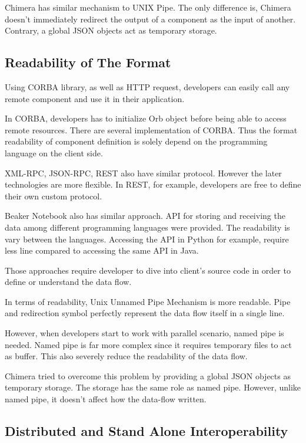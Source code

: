 \documentclass[conference]{IEEEtran}
\begin{document}
Chimera has similar mechanism to UNIX Pipe. The only difference is, Chimera doesn't immediately 
redirect the output of a component as the input of another. Contrary, a global JSON objects act as
temporary storage.


\subsection{Readability of The Format}

Using CORBA library, as well as HTTP request, developers can easily call any remote component and 
use it in their application.

In CORBA, developers has to initialize Orb object before being able to access remote resources. There
are several implementation of CORBA. Thus the format readability of component definition is solely depend
on the programming language on the client side.

XML-RPC, JSON-RPC, REST also have similar protocol. However the later technologies are more flexible. 
In REST, for example, developers are free to define their own custom protocol.

Beaker Notebook also has similar approach. API for storing and receiving the data among different programming
languages were provided. The readability is vary between the languages. Accessing the API in Python for example, 
require less line compared to accessing the same API in Java.

Those approaches require developer to dive into client's source code in order to define or understand the data flow.

In terms of readability, Unix Unnamed Pipe Mechanism is more readable. Pipe and redirection symbol perfectly represent
the data flow itself in a single line.

However, when developers start to work with parallel scenario, named pipe is needed. Named pipe is far more complex since
it requires temporary files to act as buffer. This also severely reduce the readability of the data flow.

Chimera tried to overcome this problem by providing a global JSON objects as temporary storage. 
The storage has the same role as named pipe. However, unlike named pipe, it doesn't affect how the data-flow written.

\subsection{Distributed and Stand Alone Interoperability}
\end{document}
